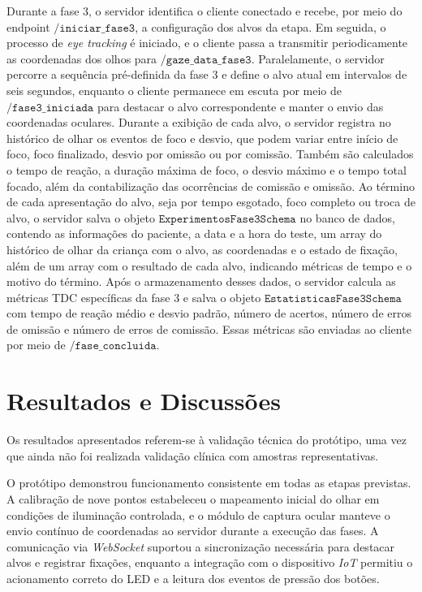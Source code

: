 \documentclass[11pt,a4paper]{article}
\begin{document}
Durante a fase 3, o servidor identifica o cliente conectado e recebe, por meio do endpoint $\texttt{/iniciar\_fase3}$, a configuração dos alvos da etapa. Em seguida, o processo de \textit{eye tracking} é iniciado, e o cliente passa a transmitir periodicamente as coordenadas dos olhos para $\texttt{/gaze\_data\_fase3}$. Paralelamente, o servidor percorre a sequência pré-definida da fase 3 e define o alvo atual em intervalos de seis segundos, enquanto o cliente permanece em escuta por meio de $\texttt{/fase3\_iniciada}$ para destacar o alvo correspondente e manter o envio das coordenadas oculares. Durante a exibição de cada alvo, o servidor registra no histórico de olhar os eventos de foco e desvio, que podem variar entre início de foco, foco finalizado, desvio por omissão ou por comissão. Também são calculados o tempo de reação, a duração máxima de foco, o desvio máximo e o tempo total focado, além da contabilização das ocorrências de comissão e omissão. Ao término de cada apresentação do alvo, seja por tempo esgotado, foco completo ou troca de alvo, o servidor salva o objeto $\texttt{ExperimentosFase3Schema}$ no banco de dados, contendo as informações do paciente, a data e a hora do teste, um array do histórico de olhar da criança com o alvo, as coordenadas e o estado de fixação, além de um array com o resultado de cada alvo, indicando métricas de tempo e o motivo do término. Após o armazenamento desses dados, o servidor calcula as métricas TDC específicas da fase 3 e salva o objeto $\texttt{EstatisticasFase3Schema}$ com tempo de reação médio e desvio padrão, número de acertos, número de erros de omissão e número de erros de comissão. Essas métricas são enviadas ao cliente por meio de $\texttt{/fase\_concluida}$.

\section{Resultados e Discussões}

Os resultados apresentados referem-se à validação técnica do protótipo, uma vez que ainda não foi realizada validação clínica com amostras representativas.

O protótipo demonstrou funcionamento consistente em todas as etapas previstas. A calibração de nove pontos estabeleceu o mapeamento inicial do olhar em condições de iluminação controlada, e o módulo de captura ocular manteve o envio contínuo de coordenadas ao servidor durante a execução das fases. A comunicação via \textit{WebSocket} suportou a sincronização necessária para destacar alvos e registrar fixações, enquanto a integração com o dispositivo \textit{IoT} permitiu o acionamento correto do LED e a leitura dos eventos de pressão dos botões.
\end{document}
